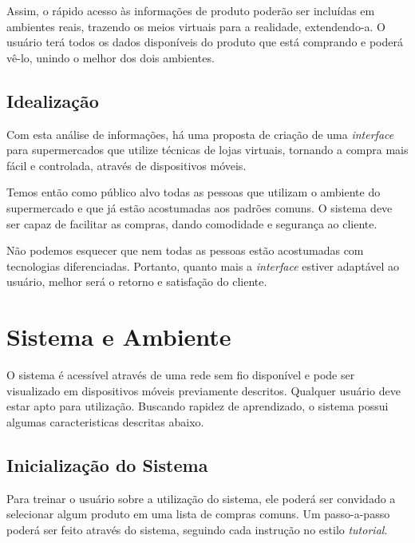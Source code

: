 \documentclass{article}
\begin{document}

Assim, o rápido acesso às informações de produto poderão ser incluídas em
ambientes reais, trazendo os meios virtuais para a realidade, extendendo-a. O
usuário terá todos os dados disponíveis do produto que está comprando e poderá
vê-lo, unindo o melhor dos dois ambientes.

\subsection{Idealização}


Com esta análise de informações, há uma proposta de criação de uma
\emph{interface} para supermercados que utilize técnicas de lojas virtuais,
tornando a compra mais fácil e controlada, através de dispositivos móveis.


Temos então como público alvo todas as pessoas que utilizam o ambiente do
supermercado e que já estão acostumadas aos padrões comuns. O sistema deve ser
capaz de facilitar as compras, dando comodidade e segurança ao cliente.


Não podemos esquecer que nem todas as pessoas estão acostumadas com tecnologias
diferenciadas. Portanto, quanto mais a \emph{interface} estiver adaptável ao
usuário, melhor será o retorno e satisfação do cliente.

\section{Sistema e Ambiente}
\label{sec:sistema}


O sistema é acessível através de uma rede sem fio disponível e pode ser
visualizado em dispositivos móveis previamente descritos. Qualquer usuário deve
estar apto para utilização. Buscando rapidez de aprendizado, o sistema possui
algumas caracteristicas descritas abaixo.

\subsection{Inicialização do Sistema}


Para treinar o usuário sobre a utilização do sistema, ele poderá ser convidado a
selecionar algum produto em uma lista de compras comuns. Um passo-a-passo poderá
ser feito através do sistema, seguindo cada instrução no estilo \emph{tutorial}.
\end{document}
